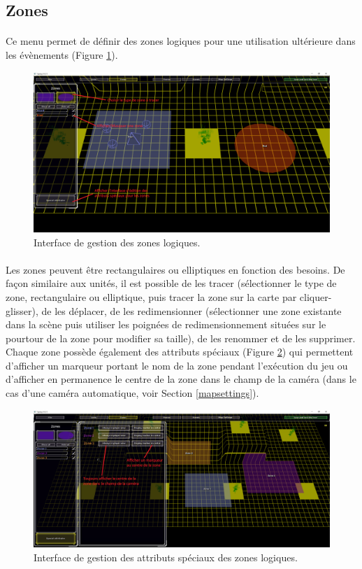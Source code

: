 \documentclass[a4paper]{article}
\begin{document}
\subsection{Zones}
\paragraph{ }
Ce menu permet de définir des zones logiques pour une utilisation ultérieure dans les évènements (Figure \ref{fig:editor-zones}).
\begin{figure}[H]
\centering
\includegraphics[width=\linewidth]{editor-zones.png}
\caption{Interface de gestion des zones logiques.}
\label{fig:editor-zones}
\end{figure}
\paragraph{ }
Les zones peuvent être rectangulaires ou elliptiques en fonction des besoins. De façon similaire aux unités, il est possible de les tracer (sélectionner le type de zone, rectangulaire ou elliptique, puis tracer la zone sur la carte par cliquer-glisser), de les déplacer, de les redimensionner (sélectionner une zone existante dans la scène puis utiliser les poignées de redimensionnement situées sur le pourtour de la zone pour modifier sa taille), de les renommer et de les supprimer. Chaque zone possède également des attributs spéciaux (Figure \ref{fig:editor-zones-special}) qui permettent d'afficher un marqueur portant le nom de la zone pendant l'exécution du jeu ou d'afficher en permanence le centre de la zone dans le champ de la caméra (dans le cas d'une caméra automatique, voir Section \ref{mapsettings}).
\begin{figure}[H]
\centering
\includegraphics[width=\linewidth]{editor-zones-special.png}
\caption{Interface de gestion des attributs spéciaux des zones logiques.}
\label{fig:editor-zones-special}
\end{figure}
\end{document}
